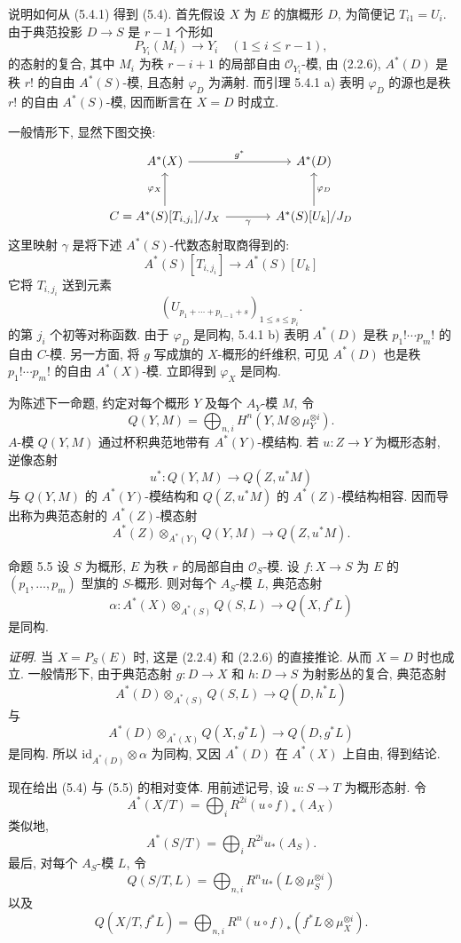 说明如何从 (5.4.1) 得到 (5.4). 首先假设 $X$ 为 $E$ 的旗概形 $D$, 为简便记 $T_{i1}=U_i$. 由于典范投影 $D\to S$ 是 $r-1$ 个形如
\[
P_{Y_i}(M_i)\to Y_i\quad(1\le i\le r-1),
\]
的态射的复合, 其中 $M_i$ 为秩 $r-i+1$ 的局部自由 $\mathcal O_{Y_i}$-模, 由 (2.2.6), $A^*(D)$ 是秩 $r!$ 的自由 $A^*(S)$-模, 且态射 $\varphi_D$ 为满射. 而引理 5.4.1 a) 表明 $\varphi_D$ 的源也是秩 $r!$ 的自由 $A^*(S)$-模, 因而断言在 $X=D$ 时成立.

一般情形下, 显然下图交换:
\[
\begin{tikzcd}[column sep=large,row sep=large]
A^*(X) \arrow[r,"g^*"] & A^*(D)\\
C=A^*(S)[T_{i,j_i}]/J_X \arrow[u,"\varphi_X"] \arrow[r,"\gamma"'] &
A^*(S)[U_k]/J_D \arrow[u,"\varphi_D"']
\end{tikzcd}
\]
这里映射 $\gamma$ 是将下述 $A^*(S)$-代数态射取商得到的:
\[
A^*(S)[T_{i,j_i}]\to A^*(S)[U_k]
\]
它将 $T_{i,j_i}$ 送到元素
\[
(U_{p_1+\cdots+p_{i-1}+s})_{1\le s\le p_i}.
\]
的第 $j_i$ 个初等对称函数. 由于 $\varphi_D$ 是同构, 5.4.1 b) 表明 $A^*(D)$ 是秩 $p_1!\cdots p_m!$ 的自由 $C$-模. 另一方面, 将 $g$ 写成旗的 $X$-概形的纤维积, 可见 $A^*(D)$ 也是秩 $p_1!\cdots p_m!$ 的自由 $A^*(X)$-模. 立即得到 $\varphi_X$ 是同构.

为陈述下一命题, 约定对每个概形 $Y$ 及每个 $A_Y$-模 $M$, 令
\[
Q(Y,M)=\bigoplus_{n,i}H^n(Y,M\otimes\mu_Y^{\otimes i}).
\]
$A$-模 $Q(Y,M)$ 通过杯积典范地带有 $A^*(Y)$-模结构. 若 $u:Z\to Y$ 为概形态射, 逆像态射
\[
u^*:Q(Y,M)\to Q(Z,u^*M)
\]
与 $Q(Y,M)$ 的 $A^*(Y)$-模结构和 $Q(Z,u^*M)$ 的 $A^*(Z)$-模结构相容. 因而导出称为典范态射的 $A^*(Z)$-模态射
\[
A^*(Z)\otimes_{A^*(Y)}Q(Y,M)\to Q(Z,u^*M).
\]

\begin{statement}{命题 5.5}
设 $S$ 为概形, $E$ 为秩 $r$ 的局部自由 $\mathcal O_S$-模. 设 $f:X\to S$ 为 $E$ 的 $(p_1,\ldots,p_m)$ 型旗的 $S$-概形. 则对每个 $A_S$-模 $L$, 典范态射
\[
\alpha:A^*(X)\otimes_{A^*(S)}Q(S,L)\to Q(X,f^*L)
\]
是同构.
\end{statement}

\emph{证明.} 当 $X=P_S(E)$ 时, 这是 (2.2.4) 和 (2.2.6) 的直接推论. 从而 $X=D$ 时也成立. 一般情形下, 由于典范态射 $g:D\to X$ 和 $h:D\to S$ 为射影丛的复合, 典范态射
\[
A^*(D)\otimes_{A^*(S)}Q(S,L)\to Q(D,h^*L)
\]
与
\[
A^*(D)\otimes_{A^*(X)}Q(X,g^*L)\to Q(D,g^*L)
\]
是同构. 所以 $\mathrm{id}_{A^*(D)}\otimes\alpha$ 为同构, 又因 $A^*(D)$ 在 $A^*(X)$ 上自由, 得到结论.

现在给出 (5.4) 与 (5.5) 的相对变体. 用前述记号, 设 $u:S\to T$ 为概形态射. 令
\[
A^*(X/T)=\bigoplus_i R^{2i}(u\circ f)_*(A_X)
\]
类似地,
\[
A^*(S/T)=\bigoplus_i R^{2i}u_*(A_S).
\]
最后, 对每个 $A_S$-模 $L$, 令
\[
Q(S/T,L)=\bigoplus_{n,i}R^n u_*(L\otimes\mu_S^{\otimes i})
\]
以及
\[
Q(X/T,f^*L)=\bigoplus_{n,i}R^n(u\circ f)_*(f^*L\otimes\mu_X^{\otimes i}).
\]

